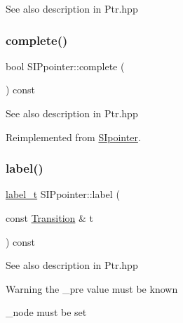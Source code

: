 \begin{DoxySeeAlso}{See also}
description in Ptr.\+hpp 
\end{DoxySeeAlso}
\mbox{\label{group__table_ga2f95b5a2058b20744a00737b1240bc83}} 
\subsubsection{\texorpdfstring{complete()}{complete()}\hspace{0.1cm}{\footnotesize\ttfamily [2/2]}}
{\footnotesize\ttfamily bool S\+I\+Ppointer\+::complete (\begin{DoxyParamCaption}{ }\end{DoxyParamCaption}) const\hspace{0.3cm}{\ttfamily [virtual]}}

\begin{DoxySeeAlso}{See also}
description in Ptr.\+hpp 
\end{DoxySeeAlso}


Reimplemented from \mbox{\hyperlink{group__table_ga638627bc96caa0f1dbf7093f0f70951b}{S\+Ipointer}}.

\mbox{\label{group__table_ga7f7cd8ae86d71b147fc662d3cc4977c0}} 
\subsubsection{\texorpdfstring{label()}{label()}\hspace{0.1cm}{\footnotesize\ttfamily [2/2]}}
{\footnotesize\ttfamily \mbox{\hyperlink{group__output_ga22fde970e635fcf63962743b2d5c441d}{label\+\_\+t}} S\+I\+Ppointer\+::label (\begin{DoxyParamCaption}\item[{const \mbox{\hyperlink{classTransition}{Transition}} \&}]{t }\end{DoxyParamCaption}) const\hspace{0.3cm}{\ttfamily [virtual]}}

\begin{DoxySeeAlso}{See also}
description in Ptr.\+hpp 
\end{DoxySeeAlso}
\begin{DoxyWarning}{Warning}
the \+\_\+pre value must be known 

\+\_\+node must be set 
\end{DoxyWarning}


